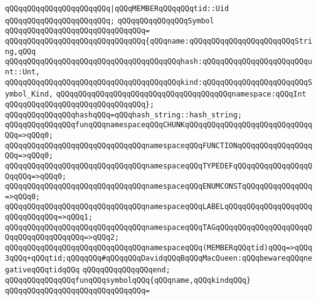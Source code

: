 \verb|qQQqqQQqqQQqqQQqqQQqqQQq|\verb#|qQQqMEMBERqQQqqQQqtid::Uid#\newline
\verb|qQQqqQQqqQQqqQQqqQQqqQQq;|\newline
\newline
\verb|qQQqqQQqqQQqqQQqSymbol|\newline
\verb|qQQqqQQqqQQqqQQqqQQqqQQqqQQqqQQq=|\newline
\verb|qQQqqQQqqQQqqQQqqQQqqQQqqQQqqQQq{qQQqname:qQQqqQQqqQQqqQQqqQQqqQQqString,qQQq|\newline
\verb|qQQqqQQqqQQqqQQqqQQqqQQqqQQqqQQqqQQqqQQqhash:qQQqqQQqqQQqqQQqqQQqqQQqunt::Unt,|\newline
\newline
\verb|qQQqqQQqqQQqqQQqqQQqqQQqqQQqqQQqqQQqqQQqkind:qQQqqQQqqQQqqQQqqQQqqQQqSymbol_Kind,|\newline
\verb|qQQqqQQqqQQqqQQqqQQqqQQqqQQqqQQqqQQqqQQqnamespace:qQQqInt|\newline
\verb|qQQqqQQqqQQqqQQqqQQqqQQqqQQqqQQq};|\newline
\newline
\verb|qQQqqQQqqQQqqQQqhashqQQq=qQQqhash_string::hash_string;|\newline
\newline
\verb|qQQqqQQqqQQqqQQqfunqQQqnamespaceqQQqCHUNKqQQqqQQqqQQqqQQqqQQqqQQqqQQqqQQq=>qQQq0;|\newline
\verb|qQQqqQQqqQQqqQQqqQQqqQQqqQQqqQQqnamespaceqQQqFUNCTIONqQQqqQQqqQQqqQQqqQQq=>qQQq0;|\newline
\verb|qQQqqQQqqQQqqQQqqQQqqQQqqQQqqQQqnamespaceqQQqTYPEDEFqQQqqQQqqQQqqQQqqQQqqQQq=>qQQq0;|\newline
\verb|qQQqqQQqqQQqqQQqqQQqqQQqqQQqqQQqnamespaceqQQqENUMCONSTqQQqqQQqqQQqqQQq=>qQQq0;|\newline
\verb|qQQqqQQqqQQqqQQqqQQqqQQqqQQqqQQqnamespaceqQQqLABELqQQqqQQqqQQqqQQqqQQqqQQqqQQqqQQq=>qQQq1;|\newline
\verb|qQQqqQQqqQQqqQQqqQQqqQQqqQQqqQQqnamespaceqQQqTAGqQQqqQQqqQQqqQQqqQQqqQQqqQQqqQQqqQQqqQQq=>qQQq2;|\newline
\verb|qQQqqQQqqQQqqQQqqQQqqQQqqQQqqQQqnamespaceqQQq(MEMBERqQQqtid)qQQq=>qQQq3qQQq+qQQqtid;qQQqqQQq#qQQqqQQqDavidqQQqBqQQqMacQueen:qQQqbewareqQQqnegativeqQQqtidqQQq|\newline
\verb|qQQqqQQqqQQqqQQqend;|\newline
\newline
\verb|qQQqqQQqqQQqqQQqfunqQQqsymbolqQQq{qQQqname,qQQqkindqQQq}|\newline
\verb|qQQqqQQqqQQqqQQqqQQqqQQqqQQqqQQq=|\newline
